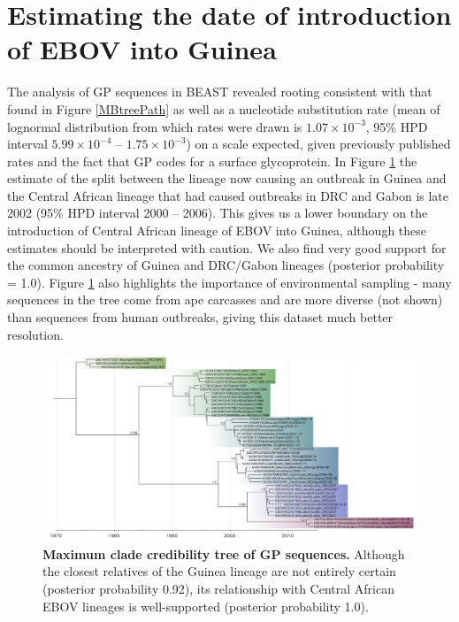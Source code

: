 \documentclass[11pt,oneside,letterpaper]{article}
\begin{document}
\section*{Estimating the date of introduction of EBOV into Guinea}
The analysis of GP sequences in BEAST revealed rooting consistent with that found in Figure \ref{MBtreePath} as well as a nucleotide substitution rate (mean of lognormal distribution from which rates were drawn is $1.07\times10^{-3}$, 95\% HPD interval $5.99\times10^{-4}$ -- $1.75\times10^{-3}$) on a scale expected, given previously published rates \cite{carroll2013} and the fact that GP codes for a surface glycoprotein.
In Figure \ref{beastTree} the estimate of the split between the lineage now causing an outbreak in Guinea and the Central African lineage that had caused outbreaks in DRC and Gabon is late 2002  (95\% HPD interval  2000 -- 2006).
This gives us a lower boundary on the introduction of Central African lineage of EBOV into Guinea, although these estimates should be interpreted with caution.
We also find very good support for the common ancestry of Guinea and DRC/Gabon lineages (posterior probability = 1.0).
Figure \ref{beastTree} also highlights the importance of environmental sampling - many sequences in the tree come from ape carcasses and are more diverse (not shown) than sequences from human outbreaks, giving this dataset much better resolution.

\begin{figure}[h!]
\centering  
\includegraphics[width=1\textwidth]  {figures/EBOV_GP_46_GTRG_UCLN_EGC_MCC_tree.png}
\caption{\textbf{Maximum clade credibility tree of GP sequences.}
Although the closest relatives of the Guinea lineage are not entirely certain (posterior probability 0.92), its relationship with Central African EBOV lineages is well-supported (posterior probability 1.0).}
\label{beastTree}
\end{figure}
\end{document}
